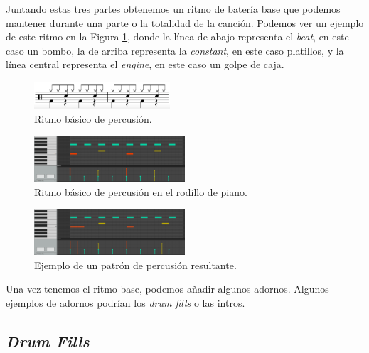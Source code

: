     Juntando estas tres partes obtenemos un ritmo de batería base que podemos mantener durante una parte o la totalidad de la canción. Podemos ver un ejemplo de este ritmo en la Figura \ref{fig:ritmo-basico-percusion}, donde la línea de abajo representa el \textit{beat}, en este caso un bombo, la de arriba representa la \textit{constant}, en este caso platillos, y la línea central representa el \textit{engine}, en este caso un golpe de caja.

     \begin{figure}[h]
        \centering
        \includegraphics[width = 0.45\textwidth]{Imagenes/Bitmap/BateriaBasico.png}
        \caption{Ritmo básico de percusión.}
        \label{fig:ritmo-basico-percusion}
    \end{figure}

    \begin{figure}[h]
        \centering
        \includegraphics[width = 0.5\textwidth]{Imagenes/Bitmap/PatronPercusionOriginal.png}
        \caption{Ritmo básico de percusión en el rodillo de piano.}
        \label{fig:PatronPercusionOriginal}
    \end{figure}

    \begin{figure}[h]
        \centering
        \includegraphics[width = 0.5\textwidth]{Imagenes/Bitmap/PatronPercusionBasico.png}
        \caption{Ejemplo de un patrón de percusión resultante.}
        \label{fig:PatronPercusionBasico}
    \end{figure}

    
    Una vez tenemos el ritmo base, podemos añadir algunos adornos. Algunos ejemplos de adornos podrían los \textit{drum fills} o las intros.

    \subsection{\textit{Drum Fills}}
    \label{subsubsec:generacion-drum-fills}

